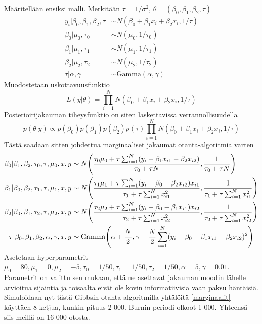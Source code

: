 Määritellään ensiksi malli. Merkitään $\tau = 1/\sigma^2$, $\theta = (\beta_0,\beta_1,\beta_2,\tau)$
\begin{equation}
\begin{split}
	y_i|\beta_0,\beta_1,\beta_2,\tau &\sim N(\beta_0+\beta_1 x_i+\beta_2x_i, 1/\tau) \\
	\beta_0|\mu_0,\tau_0 &\sim N(\mu_0, 1/\tau_0) \\
	\beta_1|\mu_1,\tau_1 &\sim N(\mu_1, 1/\tau_1) \\
	\beta_2|\mu_2,\tau_2 &\sim N(\mu_2, 1/\tau_2) \\
	\tau|\alpha, \gamma &\sim \mathrm{Gamma}(\alpha, \gamma)
\end{split}	
\end{equation}
Muodostetaan uskottavuusfunktio
\begin{equation}
	L(y|\theta) = \prod_{i=1}^{N} N(\beta_0+\beta_1 x_i+\beta_2x_i, 1/\tau)
\end{equation}
Posterioirijakauman tiheysfunktio on siten laskettavissa verrannollisuudella
\begin{equation}
	p(\theta|y) \propto p(\beta_0)p(\beta_1)p(\beta_2)p(\tau)\prod_{i=1}^{N} N(\beta_0+\beta_1 x_i+\beta_2x_i, 1/\tau)
\end{equation}
Tästä saadaan sitten johdettua marginaaliset jakaumat otanta-algoritmia varten
\begin{equation}\label{marginaalit}
\begin{split}
	\beta_0 | \beta_1,\beta_2,\tau_0,\tau,\mu_0,x,y &\sim 
	N\pqty{\frac{\tau_0\mu_0+\tau\sum_{i=1}^{N}(y_i-\beta_1x_{i1}-\beta_2x_{i2})}{\tau_0+\tau N}, \frac{1}{\tau_0+\tau N}} \\
	\beta_1 | \beta_0,\beta_2,\tau_1,\tau,\mu_1,x,y &\sim 
	N\pqty{\frac{\tau_1\mu_1+\tau\sum_{i=1}^{N}(y_i-\beta_0-\beta_2x_{i2})x_{i1}}{\tau_1+\tau\sum_{i=1}^{N}x_{i1}^2}, \frac{1}{\tau_1+\tau\sum_{i=1}^{N}x_{i1}^2}}\\
	\beta_2 | \beta_0,\beta_1,\tau_2,\tau,\mu_2,x,y &\sim 
	N\pqty{\frac{\tau_2\mu_2+\tau\sum_{i=1}^{N}(y_i-\beta_0-\beta_1x_{i1})x_{i2}}{\tau_2+\tau\sum_{i=1}^{N}x_{i2}^2}, \frac{1}{\tau_2+\tau\sum_{i=1}^{N}x_{i2}^2}}\\
	\tau | \beta_0,\beta_1,\beta_2,\alpha,\gamma,x,y &\sim 
	\mathrm{Gamma}\pqty{\alpha+\frac{N}{2},\gamma + \frac{N}{2}\sum_{i=1}^{N}(y_i-\beta_0-\beta_1x_{i1}-\beta_2x_{i2})^2}
\end{split}
\end{equation}
Asetetaan hyperparametrit $\mu_0 = 80,\mu_1 = 0, \mu_2 = -5, \tau_0 = 1/50, \tau_1 = 1/50, \tau_2 = 1/50, \alpha	= 5, \gamma = 0.01$. Parametrit on valittu sen mukaan, että ne asettavat jakauman moodin lähelle arvioitua sijaintia ja toisaalta eivät ole kovin informatiivisia vaan paksu häntäisiä. Simuloidaan nyt tästä Gibbsin otanta-algoritmilla yhtälöitä \ref{marginaalit} käyttäen 8 ketjua, kunkin pituus 2 000. Burnin-periodi olkoot 1 000. Yhteensä siis meillä on  16 000 otosta.

